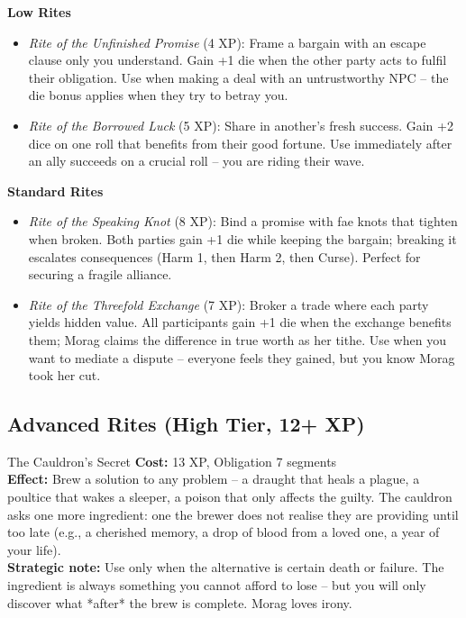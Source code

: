 \documentclass[10pt,a5paper]{book}
\begin{document}
\textbf{Low Rites}
\begin{itemize}
    \item \textit{Rite of the Unfinished Promise} (4 XP): Frame a bargain with an escape clause only you understand. Gain +1 die when the other party acts to fulfil their obligation. Use when making a deal with an untrustworthy NPC – the die bonus applies when they try to betray you.
    \item \textit{Rite of the Borrowed Luck} (5 XP): Share in another’s fresh success. Gain +2 dice on one roll that benefits from their good fortune. Use immediately after an ally succeeds on a crucial roll – you are riding their wave.
\end{itemize}

\textbf{Standard Rites}
\begin{itemize}
    \item \textit{Rite of the Speaking Knot} (8 XP): Bind a promise with fae knots that tighten when broken. Both parties gain +1 die while keeping the bargain; breaking it escalates consequences (Harm 1, then Harm 2, then Curse). Perfect for securing a fragile alliance.
    \item \textit{Rite of the Threefold Exchange} (7 XP): Broker a trade where each party yields hidden value. All participants gain +1 die when the exchange benefits them; Morag claims the difference in true worth as her tithe. Use when you want to mediate a dispute – everyone feels they gained, but you know Morag took her cut.
\end{itemize}

\subsection*{Advanced Rites (High Tier, 12+ XP)}

\begin{patronbox}{The Cauldron’s Secret}
\textbf{Cost:} 13 XP, Obligation 7 segments \\
\textbf{Effect:} Brew a solution to any problem – a draught that heals a plague, a poultice that wakes a sleeper, a poison that only affects the guilty. The cauldron asks one more ingredient: one the brewer does not realise they are providing until too late (e.g., a cherished memory, a drop of blood from a loved one, a year of your life). \\
\textbf{Strategic note:} Use only when the alternative is certain death or failure. The ingredient is always something you cannot afford to lose – but you will only discover what *after* the brew is complete. Morag loves irony.
\end{patronbox}
\end{document}
